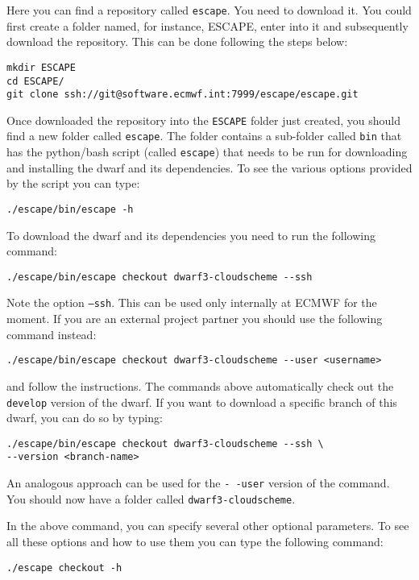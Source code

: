 \documentclass[
a4paper,     %
12pt,        %
article,
onecolumn,   %
openany,     %
]{memoir}
\newcommand{\inlsh}[1]{\texttt{#1}}
\newcommand{\inlsh}[1]{\tikz[anchor=base,baseline]\node[inner sep=2pt,
outer sep=0,draw=yellow!10,fill=yellow!10]{\texttt{#1}};}
\begin{document}
Here you can find a repository called \inlsh{escape}.
You need to download it. You could first create a 
folder named, for instance, ESCAPE, enter into it 
and subsequently download the repository. 
This can be done following the steps below:
%
\begin{lstlisting}[style=BashStyle]
mkdir ESCAPE
cd ESCAPE/
git clone ssh://git@software.ecmwf.int:7999/escape/escape.git
\end{lstlisting}
%
Once downloaded the repository into the \inlsh{ESCAPE} folder 
just created, you should find a new folder called \inlsh{escape}. 
The folder contains a sub-folder called \inlsh{bin} that has the 
python/bash script (called \inlsh{escape}) that needs to be 
run for downloading and installing the dwarf and its dependencies. 
To see the various options provided by the script you can type:
%
\begin{lstlisting}[style=BashStyle]
./escape/bin/escape -h
\end{lstlisting}
%
To download the dwarf and its dependencies you need to run 
the following command:
%
\begin{lstlisting}[style=BashStyle]
./escape/bin/escape checkout dwarf3-cloudscheme --ssh
\end{lstlisting}
% 
Note the option \inlsh{--ssh}. This can be used only internally 
at ECMWF for the moment. If you are an external project partner
you should use the following command instead:
%
\begin{lstlisting}[style=BashStyle]
./escape/bin/escape checkout dwarf3-cloudscheme --user <username>
\end{lstlisting}
% 
and follow the instructions. 
The commands above automatically check out the \inlsh{develop}
version of the dwarf. If you want to download a specific branch 
of this dwarf, you can do so by typing:
%
\begin{lstlisting}[style=BashStyle]
./escape/bin/escape checkout dwarf3-cloudscheme --ssh \
--version <branch-name>
\end{lstlisting}
% 
An analogous approach can be used for the \inlsh{-\,-user} 
version of the command. You should now have a folder called 
\inlsh{dwarf3-cloudscheme}.

In the above command, you can specify several other optional 
parameters. To see all these options and how to use them you 
can type the following command:
%
\begin{lstlisting}[style=BashStyle]
./escape checkout -h
\end{lstlisting}
%
\end{document}
